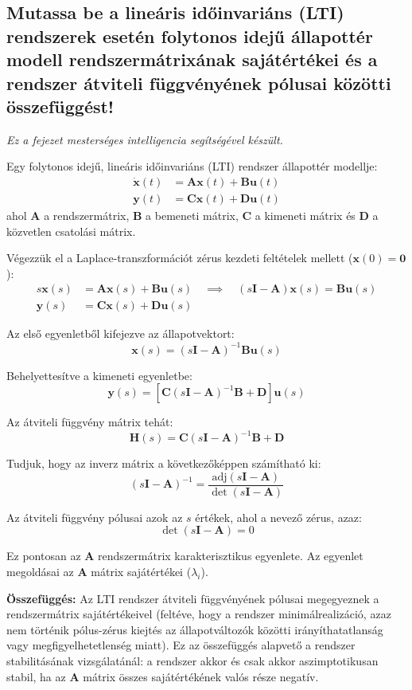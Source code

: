 \subsection{Mutassa be a lineáris időinvariáns (LTI) rendszerek esetén folytonos idejű állapottér modell rendszermátrixának sajátértékei és a rendszer átviteli függvényének pólusai közötti összefüggést!}

\noindent \textit{Ez a fejezet mesterséges intelligencia segítségével készült.}

Egy folytonos idejű, lineáris időinvariáns (LTI) rendszer állapottér modellje:
\begin{align*}
    \dot{\mathbf{x}}(t) &= \mathbf{A}\mathbf{x}(t) + \mathbf{B}\mathbf{u}(t) \\
    \mathbf{y}(t) &= \mathbf{C}\mathbf{x}(t) + \mathbf{D}\mathbf{u}(t)
\end{align*}
ahol $\mathbf{A}$ a rendszermátrix, $\mathbf{B}$ a bemeneti mátrix, $\mathbf{C}$ a kimeneti mátrix és $\mathbf{D}$ a közvetlen csatolási mátrix.

Végezzük el a Laplace-transzformációt zérus kezdeti feltételek mellett ($\mathbf{x}(0) = \mathbf{0}$):
\begin{align*}
    s\mathbf{x}(s) &= \mathbf{A}\mathbf{x}(s) + \mathbf{B}\mathbf{u}(s) \quad \implies \quad (s\mathbf{I} - \mathbf{A})\mathbf{x}(s) = \mathbf{B}\mathbf{u}(s) \\
    \mathbf{y}(s) &= \mathbf{C}\mathbf{x}(s) + \mathbf{D}\mathbf{u}(s)
\end{align*}

Az első egyenletből kifejezve az állapotvektort:
$$ \mathbf{x}(s) = (s\mathbf{I} - \mathbf{A})^{-1}\mathbf{B}\mathbf{u}(s) $$

Behelyettesítve a kimeneti egyenletbe:
$$ \mathbf{y}(s) = \left[ \mathbf{C}(s\mathbf{I} - \mathbf{A})^{-1}\mathbf{B} + \mathbf{D} \right] \mathbf{u}(s) $$

Az átviteli függvény mátrix tehát:
$$ \mathbf{H}(s) = \mathbf{C}(s\mathbf{I} - \mathbf{A})^{-1}\mathbf{B} + \mathbf{D} $$

Tudjuk, hogy az inverz mátrix a következőképpen számítható ki:
$$ (s\mathbf{I} - \mathbf{A})^{-1} = \frac{\text{adj}(s\mathbf{I} - \mathbf{A})}{\det(s\mathbf{I} - \mathbf{A})} $$

Az átviteli függvény pólusai azok az $s$ értékek, ahol a nevező zérus, azaz:
$$ \det(s\mathbf{I} - \mathbf{A}) = 0 $$

Ez pontosan az $\mathbf{A}$ rendszermátrix karakterisztikus egyenlete. Az egyenlet megoldásai az $\mathbf{A}$ mátrix sajátértékei ($\lambda_i$).

\textbf{Összefüggés:}
Az LTI rendszer átviteli függvényének pólusai megegyeznek a rendszermátrix sajátértékeivel (feltéve, hogy a rendszer minimálrealizáció, azaz nem történik pólus-zérus kiejtés az állapotváltozók közötti irányíthatatlanság vagy megfigyelhetetlenség miatt). Ez az összefüggés alapvető a rendszer stabilitásának vizsgálatánál: a rendszer akkor és csak akkor aszimptotikusan stabil, ha az $\mathbf{A}$ mátrix összes sajátértékének valós része negatív.
